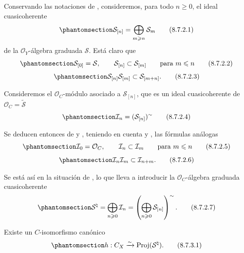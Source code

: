 \documentclass[oneside,10pt]{amsart}
\let\EGAOriginalLabel\label
\renewcommand{\label}[1]{\phantomsection\EGAOriginalLabel{#1}}
\begin{document}
\begin{env}[8.7.2]
\label{II.8.7.2-fr}
Conservando las notaciones de , consideremos, para todo $n\geqslant 0$, el ideal cuasicoherente
\begin{equation}
\label{II.8.7.2.1-fr}
  \mathcal{S}_{[n]}=\bigoplus_{m\geqslant n}\mathcal{S}_m
\tag{8.7.2.1}
\end{equation}
de la $\mathcal{O}_Y$-álgebra graduada $\mathcal{S}$.
Está claro que
\begin{equation}
\label{II.8.7.2.2-fr}
  \mathcal{S}_{[0]}=\mathcal{S},\qquad
  \mathcal{S}_{[n]}\subset\mathcal{S}_{[m]}
  \qquad\text{para }m\leqslant n
\tag{8.7.2.2}
\end{equation}
\begin{equation}
\label{II.8.7.2.3-fr}
  \mathcal{S}_{[n]}\mathcal{S}_{[m]}\subset\mathcal{S}_{[m+n]}.
\tag{8.7.2.3}
\end{equation}

Consideremos el $\mathcal{O}_C$-módulo asociado a $\mathcal{S}_{[n]}$, que es un ideal cuasicoherente de $\mathcal{O}_C=\widetilde{\mathcal{S}}$ 
\begin{equation}
\label{II.8.7.2.4-fr}
  \mathcal{I}_n=(\mathcal{S}_{[n]})^{\sim}
\tag{8.7.2.4}
\end{equation}

Se deducen entonces de  y , teniendo en cuenta  y , las fórmulas análogas
\begin{equation}
\label{II.8.7.2.5-fr}
  \mathcal{I}_0=\mathcal{O}_C,\qquad
  \mathcal{I}_n\subset\mathcal{I}_m
  \qquad\text{para }m\leqslant n
\tag{8.7.2.5}
\end{equation}
\begin{equation}
\label{II.8.7.2.6-fr}
  \mathcal{I}_n\mathcal{I}_m\subset\mathcal{I}_{n+m}.
\tag{8.7.2.6}
\end{equation}

Se está así en la situación de , lo que lleva a introducir la $\mathcal{O}_C$-álgebra graduada cuasicoherente
\begin{equation}
\label{II.8.7.2.7-fr}
  \mathcal{S}^{\natural}
  =\bigoplus_{n\geqslant 0}\mathcal{I}_n
  =\left(\bigoplus_{n\geqslant 0}\mathcal{S}_{[n]}\right)^{\sim}.
\tag{8.7.2.7}
\end{equation}
\end{env}
\begin{proposition}[8.7.3]
\label{II.8.7.3-fr}
Existe un $C$-isomorfismo canónico
\begin{equation}
\label{II.8.7.3.1-fr}
  h:C_X\xrightarrow{\sim}\operatorname{Proj}(\mathcal{S}^{\natural}).
\tag{8.7.3.1}
\end{equation}
\end{proposition}
\end{document}
